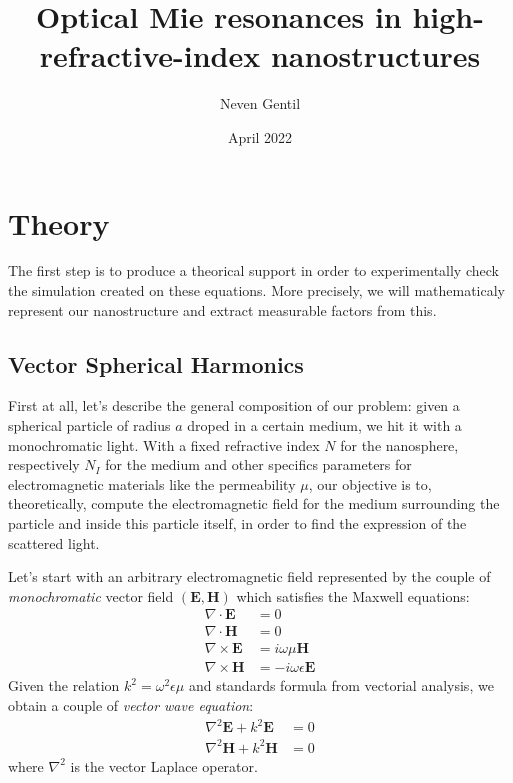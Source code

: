 \documentclass{article}
\title{Optical Mie resonances in high-refractive-index nanostructures}
\author{Neven Gentil}
\date{April 2022}
\numberwithin{equation}{section}
\begin{document}
\maketitle

\twocolumn

\section{Theory}

The first step is to produce a theorical support in order to experimentally check the simulation created on these equations. More precisely, we will mathematicaly represent our nanostructure and extract measurable factors from this.

\subsection{Vector Spherical Harmonics}

First at all, let's describe the general composition of our problem: given a spherical particle of radius $a$ droped in a certain medium, we hit it with a monochromatic light. With a fixed refractive index $N$ for the nanosphere, respectively $N_{I}$ for the medium and other specifics parameters for electromagnetic materials like the permeability $\mu$, our objective is to, theoretically, compute the electromagnetic field for the medium surrounding the particle and inside this particle itself, in order to find the expression of the scattered light.

Let's start with an arbitrary electromagnetic field represented by the couple of \textit{monochromatic} vector field $(\textbf{E}, \textbf{H})$ which satisfies the Maxwell equations:
\begin{align}
\nabla \cdot \textbf{E} &= 0\\
\nabla \cdot \textbf{H} &= 0\\
\nabla \times \textbf{E} &= i\omega \mu \textbf{H} \label{eq:rot_e} \\
\nabla \times \textbf{H} &= -i\omega \epsilon \textbf{E} \label{eq:rot_h}
\end{align}
Given the relation $k^{2} = \omega ^{2}\epsilon \mu$ and standards formula from vectorial analysis, we obtain a couple of \textit{vector wave equation}:
\begin{align}
\nabla ^{2} \textbf{E} + k^{2}\textbf{E}&=0\\
\nabla ^{2} \textbf{H} + k^{2}\textbf{H}&=0
\end{align}
where $\nabla ^{2}$ is the vector Laplace operator.
\end{document}
